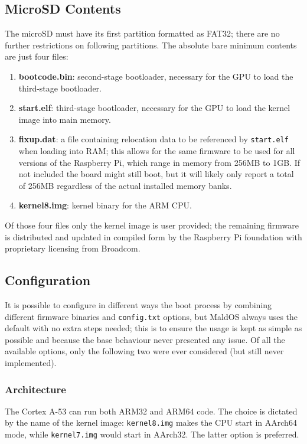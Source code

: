 \documentclass[12pt,a4paper,openright,twoside]{report}
\begin{document}
\subsection{MicroSD Contents}
The microSD must have its first partition formatted as FAT32; there are no 
further restrictions on following partitions. The absolute bare minimum contents 
are just four files:
\begin{enumerate}
    \item \textbf{bootcode.bin}: second-stage bootloader, necessary for the GPU
            to load the third-stage bootloader.
    \item \textbf{start.elf}: third-stage bootloader, necessary for the GPU to load
            the kernel image into main memory.
    \item \textbf{fixup.dat}: a file containing relocation data to be referenced 
            by {\tt start.elf} when loading into RAM; this allows for the same firmware 
            to be used for all versions of the Raspberry Pi, which range in 
            memory from 256MB to 1GB. If not included the board might still boot,
            but it will likely only report a total of 256MB regardless of the
            actual installed memory banks.
    \item \textbf{kernel8.img}: kernel binary for the ARM CPU.
\end{enumerate}
Of those four files only the kernel image is user provided; the remaining firmware
is distributed and updated in compiled form by the Raspberry Pi foundation with
proprietary licensing from Broadcom.

\subsection{Configuration}
It is possible to configure in different ways the boot process by combining
different firmware binaries and {\tt config.txt} options, but MaldOS always uses
the default with no extra steps needed; this is to ensure the usage is kept
as simple as possible and because the base behaviour never presented any issue.
Of all the available options, only the following two were ever considered 
(but still never implemented).

\subsubsection{Architecture}
The Cortex A-53 can run both ARM32 and ARM64 code. The choice is dictated by the
name of the kernel image: {\tt kernel8.img} makes the CPU start in AArch64 mode,
while {\tt kernel7.img} would start in AArch32. The latter option is preferred.
\end{document}
